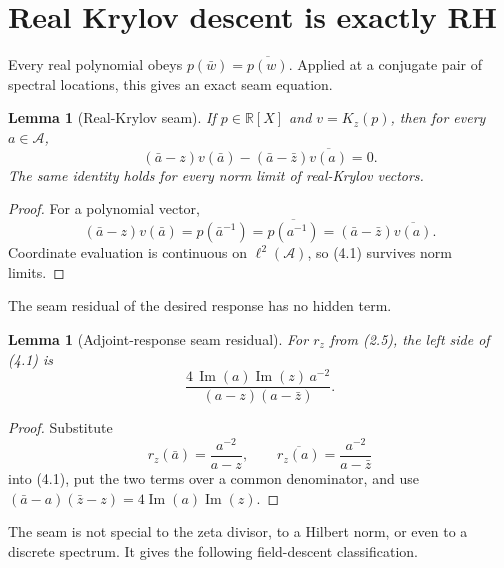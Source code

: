 \documentclass[11pt]{article}
\newtheorem{lemma}[theorem]{Lemma}
\theoremstyle{definition}
\theoremstyle{remark}
\newcommand{\R}{\mathbb R}
\newcommand{\cA}{\mathcal A}
\newcommand{\Ima}{\operatorname{Im}}
\begin{document}
\section{Real Krylov descent is exactly RH}

Every real polynomial obeys $p(\bar w)=\overline{p(w)}$.  Applied at a conjugate pair of spectral
locations, this gives an exact seam equation.

\begin{lemma}[Real-Krylov seam]
\label{lem:seam}
If $p\in\R[X]$ and $v=K_z(p)$, then for every $a\in\cA$,
\begin{equation}
 (\bar a-z)v(\bar a)
 -(\bar a-\bar z)\overline{v(a)}=0.                       \tag{4.1}
\end{equation}
The same identity holds for every norm limit of real-Krylov vectors.
\end{lemma}

\begin{proof}
For a polynomial vector,
\[
 (\bar a-z)v(\bar a)=p(\bar a^{-1})
 =\overline{p(a^{-1})}
 =(\bar a-\bar z)\overline{v(a)}.
\]
Coordinate evaluation is continuous on $\ell^2(\cA)$, so (4.1) survives norm limits.
\end{proof}

The seam residual of the desired response has no hidden term.

\begin{lemma}[Adjoint-response seam residual]
\label{lem:residual}
For $r_z$ from (2.5), the left side of (4.1) is
\begin{equation}
 \frac{4\,\Ima(a)\Ima(z)\,a^{-2}}
 {(a-z)(a-\bar z)}.                                      \tag{4.2}
\end{equation}
\end{lemma}

\begin{proof}
Substitute
\[
 r_z(\bar a)=\frac{a^{-2}}{a-z},
 \qquad
 \overline{r_z(a)}=\frac{a^{-2}}{a-\bar z}
\]
into (4.1), put the two terms over a common denominator, and use
$(\bar a-a)(\bar z-z)=4\Ima(a)\Ima(z)$.
\end{proof}

The seam is not special to the zeta divisor, to a Hilbert norm, or even to a discrete spectrum.
It gives the following field-descent classification.
\end{document}
